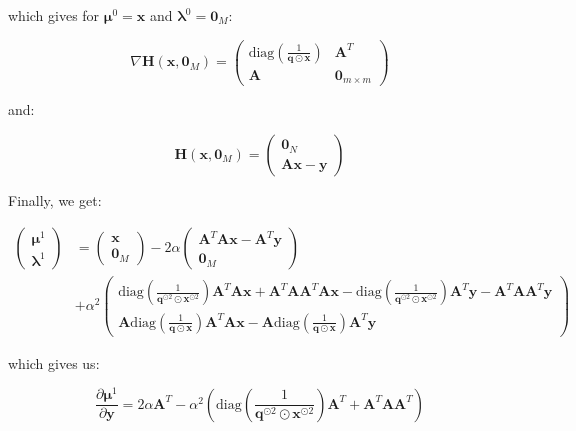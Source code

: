 \documentclass{tex/note}
\begin{document}
which gives for $\bm{\mu}^0 = \bm{x}$ and $\bm{\lambda}^0 = \bm{0}_M$:

\begin{equation*}
\nabla \bm{H} \left( \bm{x} , \bm{0}_M \right) = \begin{pmatrix} \text{diag} \left( \frac{1}{\bm{q} \odot \bm{x}} \right) & \bm{A}^T \\ \bm{A} & \bm{0}_{m \times m} \end{pmatrix}
\end{equation*}

and:

\begin{equation*}
\bm{H} \left( \bm{x} , \bm{0}_M \right) = \begin{pmatrix} \bm{0}_N \\ \bm{A} \bm{x} - \bm{y} \end{pmatrix}
\end{equation*}

Finally, we get:

\begin{align*}
\begin{pmatrix} \bm{\mu}^1 \\ \bm{\lambda}^1 \end{pmatrix} &= \begin{pmatrix} \bm{x} \\ \bm{0}_M \end{pmatrix} - 2 \alpha \begin{pmatrix} \bm{A}^T \bm{A} \bm{x} - \bm{A}^T \bm{y} \\ \bm{0}_M \end{pmatrix} \\
&+ \alpha^2 \begin{pmatrix} \text{diag} \left( \frac{1}{\bm{q}^{\odot 2} \odot \bm{x}^{\odot 2}} \right) \bm{A}^T \bm{A} \bm{x} + \bm{A}^T \bm{A} \bm{A}^T \bm{A} \bm{x} - \text{diag} \left( \frac{1}{\bm{q}^{\odot 2} \odot \bm{x}^{\odot 2}} \right) \bm{A}^T \bm{y} - \bm{A}^T \bm{A} \bm{A}^T \bm{y} \\ \bm{A} \text{diag} \left( \frac{1}{\bm{q} \odot \bm{x}} \right) \bm{A}^T \bm{A} \bm{x} - \bm{A} \text{diag} \left( \frac{1}{\bm{q} \odot \bm{x}} \right) \bm{A}^T \bm{y} \end{pmatrix}
\end{align*}

which gives us:

\begin{equation*}
\frac{\partial \bm{\mu}^1}{\partial \bm{y}} = 2 \alpha \bm{A}^T - \alpha^2 \left( \text{diag} \left( \frac{1}{\bm{q}^{\odot 2} \odot \bm{x}^{\odot 2}} \right) \bm{A}^T + \bm{A}^T \bm{A} \bm{A}^T \right)
\end{equation*}
\end{document}
